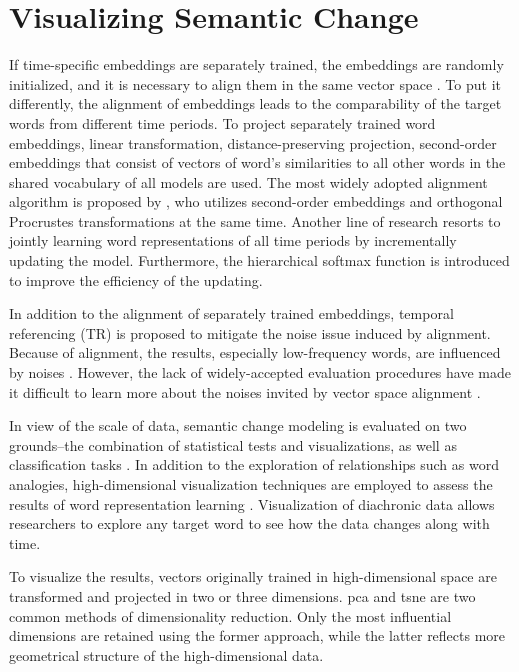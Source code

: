 \section{Visualizing Semantic Change}
If time-specific embeddings are separately trained, the embeddings are randomly initialized, and it is necessary to align them in the same vector space \parencite{hamilton2016law}. To put it differently, the alignment of embeddings leads to the comparability of the target words from different time periods. To project separately trained word embeddings, linear transformation, distance-preserving projection, second-order embeddings that consist of vectors of word's similarities to all other words in the shared vocabulary of all models are used. The most widely adopted alignment algorithm is proposed by \textcite{hamilton2016law}, who utilizes second-order embeddings and orthogonal Procrustes transformations at the same time. Another line of research resorts to jointly learning word representations of all time periods by incrementally updating the model. Furthermore, the hierarchical softmax function is introduced to improve the efficiency of the updating.

In addition to the alignment of separately trained embeddings, temporal referencing (TR) \parencite{dubossarsky2019timeforchange} is proposed to mitigate the noise issue induced by alignment. Because of alignment, the results, especially low-frequency words, are influenced by noises \parencite{dubossarsky2019timeforchange,dubossarsky2019timeout}. However, the lack of widely-accepted evaluation procedures have made it difficult to learn more about the noises invited by vector space alignment \parencite{dubossarsky2019timeout}.

In view of the scale of data, semantic change modeling is evaluated on two grounds--the combination of statistical tests and visualizations, as well as classification tasks \parencite{tang2018state}. In addition to the exploration of relationships such as word analogies, high-dimensional visualization techniques are employed to assess the results of word representation learning \parencite{liu2017visual}. Visualization of diachronic data allows researchers to explore any target word to see how the data changes along with time.

To visualize the results, vectors originally trained in high-dimensional space are transformed and projected in two or three dimensions. \gls{pca} and \gls{tsne} \parencite{vandermaaten2008tsne} are two common methods of dimensionality reduction. Only the most influential dimensions are retained using the former approach, while the latter reflects more geometrical structure of the high-dimensional data.

